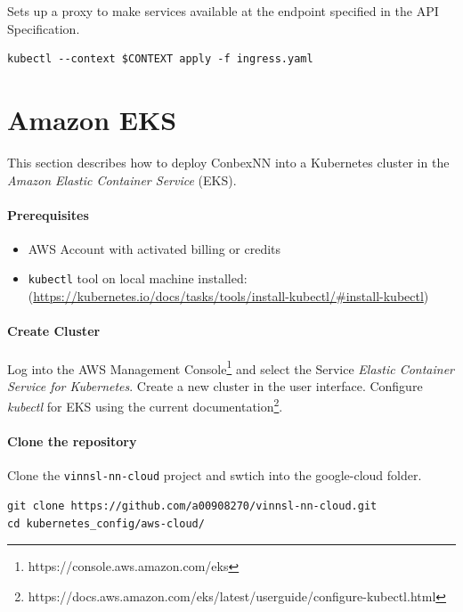 Sets up a proxy to make services available at the endpoint specified in
the API Specification.

\begin{verbatim}
kubectl --context $CONTEXT apply -f ingress.yaml
\end{verbatim}

\section{Amazon EKS}\label{amazon-eks}

This section describes how to deploy ConbexNN into a Kubernetes cluster
in the \emph{Amazon Elastic Container Service} (EKS).

\paragraph{Prerequisites}\label{prerequisites-2}

\begin{itemize}
\tightlist
\item
  AWS Account with activated billing or credits
\item
  \texttt{kubectl} tool on local machine installed:
  (\url{https://kubernetes.io/docs/tasks/tools/install-kubectl/\#install-kubectl})
\end{itemize}

\paragraph{Create Cluster}\label{create-cluster-1}

Log into the AWS Management Console\footnote{https://console.aws.amazon.com/eks}
and select the Service \emph{Elastic Container Service for Kubernetes}.
Create a new cluster in the user interface. Configure \emph{kubectl} for
EKS using the current documentation\footnote{https://docs.aws.amazon.com/eks/latest/userguide/configure-kubectl.html}.

\paragraph{Clone the repository}\label{clone-the-repository-1}

Clone the \texttt{vinnsl-nn-cloud} project and swtich into the
google-cloud folder.

\begin{verbatim}
git clone https://github.com/a00908270/vinnsl-nn-cloud.git
cd kubernetes_config/aws-cloud/
\end{verbatim}

